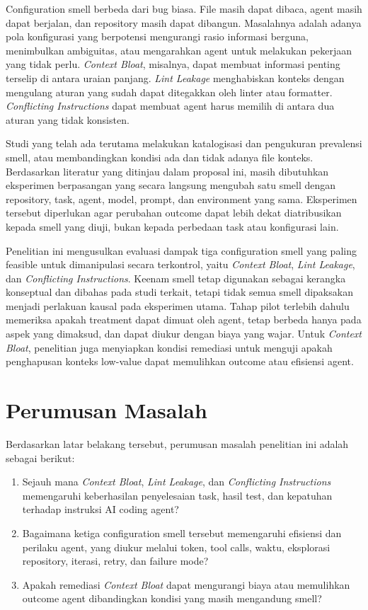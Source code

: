 Configuration smell berbeda dari bug biasa. File masih dapat dibaca, agent masih dapat berjalan, dan repository masih dapat dibangun. Masalahnya adalah adanya pola konfigurasi yang berpotensi mengurangi rasio informasi berguna, menimbulkan ambiguitas, atau mengarahkan agent untuk melakukan pekerjaan yang tidak perlu. \textit{Context Bloat}, misalnya, dapat membuat informasi penting terselip di antara uraian panjang. \textit{Lint Leakage} menghabiskan konteks dengan mengulang aturan yang sudah dapat ditegakkan oleh linter atau formatter. \textit{Conflicting Instructions} dapat membuat agent harus memilih di antara dua aturan yang tidak konsisten.

Studi yang telah ada terutama melakukan katalogisasi dan pengukuran prevalensi smell, atau membandingkan kondisi ada dan tidak adanya file konteks. Berdasarkan literatur yang ditinjau dalam proposal ini, masih dibutuhkan eksperimen berpasangan yang secara langsung mengubah satu smell dengan repository, task, agent, model, prompt, dan environment yang sama. Eksperimen tersebut diperlukan agar perubahan outcome dapat lebih dekat diatribusikan kepada smell yang diuji, bukan kepada perbedaan task atau konfigurasi lain.

Penelitian ini mengusulkan evaluasi dampak tiga configuration smell yang paling feasible untuk dimanipulasi secara terkontrol, yaitu \textit{Context Bloat}, \textit{Lint Leakage}, dan \textit{Conflicting Instructions}. Keenam smell tetap digunakan sebagai kerangka konseptual dan dibahas pada studi terkait, tetapi tidak semua smell dipaksakan menjadi perlakuan kausal pada eksperimen utama. Tahap pilot terlebih dahulu memeriksa apakah treatment dapat dimuat oleh agent, tetap berbeda hanya pada aspek yang dimaksud, dan dapat diukur dengan biaya yang wajar. Untuk \textit{Context Bloat}, penelitian juga menyiapkan kondisi remediasi untuk menguji apakah penghapusan konteks low-value dapat memulihkan outcome atau efisiensi agent.

\section{Perumusan Masalah}

Berdasarkan latar belakang tersebut, perumusan masalah penelitian ini adalah sebagai berikut:

\begin{enumerate}[leftmargin=*]
    \item Sejauh mana \textit{Context Bloat}, \textit{Lint Leakage}, dan \textit{Conflicting Instructions} memengaruhi keberhasilan penyelesaian task, hasil test, dan kepatuhan terhadap instruksi AI coding agent?
    \item Bagaimana ketiga configuration smell tersebut memengaruhi efisiensi dan perilaku agent, yang diukur melalui token, tool calls, waktu, eksplorasi repository, iterasi, retry, dan failure mode?
    \item Apakah remediasi \textit{Context Bloat} dapat mengurangi biaya atau memulihkan outcome agent dibandingkan kondisi yang masih mengandung smell?
\end{enumerate}

